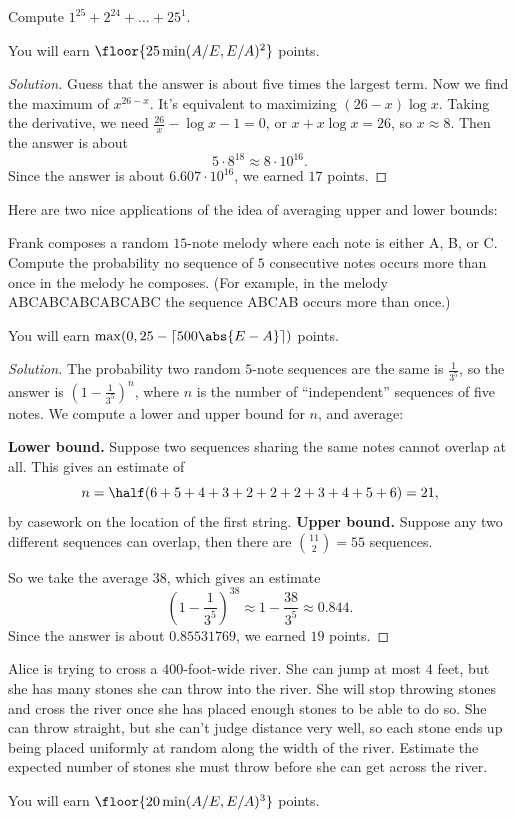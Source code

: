 \documentclass[11pt]{scrartcl}
\renewenvironment{solution}{\renewcommand\qedsymbol{$\blacksquare$}\begin{proof}[Solution]}{\end{proof}}
\begin{document}
\begin{example}
	Compute $1^{25} + 2^{24} + \dots + 25^1$.
	
	You will earn $\floor{25\min(A/E,E/A)^2}$ points.
\end{example}

\begin{solution}
	Guess that the answer is about five times the largest term. Now we find the maximum of $x^{26 - x}$. It's equivalent to maximizing $(26 - x)\log x$. Taking the derivative, we need $\frac{26}x - \log x - 1 = 0$, or $x + x\log x = 26$, so $x \approx 8$. Then the answer is about
	\[5 \cdot 8^{18} \approx 8 \cdot 10^{16}.\]
	Since the answer is about $6.607 \cdot 10^{16}$, we earned $17$ points.
\end{solution}

Here are two nice applications of the idea of averaging upper and lower bounds:

\begin{example}
	Frank composes a random $15$-note melody where each note is either A, B, or C. Compute the probability no sequence of $5$ consecutive notes occurs more than once in the melody he composes. (For example, in the melody ABCABCABCABCABC the sequence ABCAB occurs more than once.)
	
	You will earn $\max(0,25 - \lceil 500\abs{E - A}\rceil)$ points.
\end{example}

\begin{solution}
	The probability two random $5$-note sequences are the same is $\frac1{3^5}$, so the answer is $(1 - \frac1{3^5})^n$, where $n$ is the number of ``independent'' sequences of five notes. We compute a lower and upper bound for $n$, and average:
	\begin{itemize}
		\ii \textbf{Lower bound.} Suppose two sequences sharing the same notes cannot overlap at all. This gives an estimate of
		\[n = \half(6 + 5 + 4 + 3 + 2 + 2 + 2 + 3 + 4 + 5 + 6) = 21,\]
		by casework on the location of the first string.
		\ii \textbf{Upper bound.} Suppose any two different sequences can overlap, then there are $\binom{11}2 = 55$ sequences.
	\end{itemize}
	So we take the average $38$, which gives an estimate
	\[\left(1 - \frac1{3^5}\right)^{38} \approx 1 - \frac{38}{3^5} \approx 0.844.\]
	Since the answer is about $0.85531769$, we earned $19$ points.
\end{solution}

\begin{example}
	Alice is trying to cross a $400$-foot-wide river. She can jump at most $4$ feet, but she has many stones she can throw into the river. She will stop throwing stones and cross the river once she has placed enough stones to be able to do so. She can throw straight, but she can't judge distance very well, so each stone ends up being placed uniformly at random along the width of the river. Estimate the expected number of stones she must throw before she can get across the river.

	You will earn $\floor{20\min(A/E,E/A)^3}$ points.
\end{example}
\end{document}
